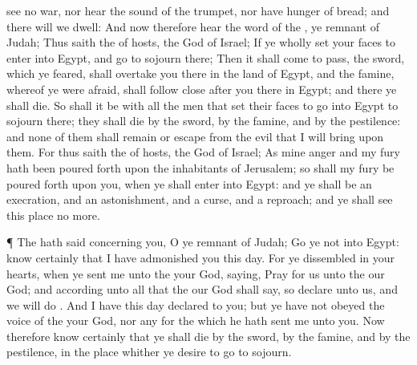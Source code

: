 {see no
war, nor
hear the
sound of the
trumpet, nor have
hunger of
bread; and there will we
dwell:
And now therefore
hear the
word of the
{}, ye
remnant of
Judah; Thus
saith the
{} of
hosts, the
God of
Israel; If ye
wholly
set your
faces to
enter into
Egypt, and
go to
sojourn there;
Then it shall come to pass,
{} the
sword, which ye
feared, shall
overtake you there in the
land of
Egypt, and the
famine, whereof ye were
afraid, shall follow
close
after you there in
Egypt; and there ye shall
die.
So shall it be with all the
men that
set their
faces to
go into
Egypt to
sojourn there; they shall
die by the
sword, by the
famine, and by the
pestilence: and none of them shall
remain or
escape
from the
evil that I will
bring upon them.
For thus
saith the
{} of
hosts, the
God of
Israel; As mine
anger and my
fury hath been poured
forth upon the
inhabitants of
Jerusalem; so shall my
fury be poured
forth upon you, when ye shall
enter into
Egypt: and ye shall be an
execration, and an
astonishment, and a
curse, and a
reproach; and ye shall
see this
place no more.
\par }{\PP {}¶ The
{} hath
said concerning you, O ye
remnant of
Judah;
Go ye not into
Egypt:
know
certainly that I have
admonished you this
day.
For ye
dissembled in your
hearts, when ye
sent me unto the
{} your
God,
saying,
Pray for us unto the
{} our
God; and according unto all that the
{} our
God shall
say, so
declare unto us, and we will
do
{}.
And
{} I have this
day
declared
{} to you; but ye have not
obeyed the
voice of the
{} your
God, nor any
{} for the which he hath
sent me unto you.
Now therefore
know
certainly that ye shall
die by the
sword, by the
famine, and by the
pestilence, in the
place whither ye
desire to
go
{} to
sojourn.

}

